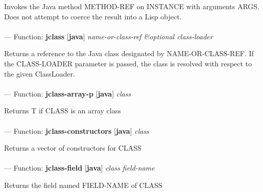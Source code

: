 \begin{adjustwidth}{5em}{5em}
Invokes the Java method METHOD-REF on INSTANCE with arguments ARGS. Does not attempt to coerce the result into a Lisp object.
\end{adjustwidth}

\paragraph{}
\label{JAVA:JCLASS}
--- Function: \textbf{jclass} [\textbf{java}] \textit{name-or-class-ref \&optional class-loader}

\begin{adjustwidth}{5em}{5em}
Returns a reference to the Java class designated by NAME-OR-CLASS-REF. If the CLASS-LOADER parameter is passed, the class is resolved with respect to the given ClassLoader.
\end{adjustwidth}

\paragraph{}
\label{JAVA:JCLASS-ARRAY-P}
--- Function: \textbf{jclass-array-p} [\textbf{java}] \textit{class}

\begin{adjustwidth}{5em}{5em}
Returns T if CLASS is an array class
\end{adjustwidth}

\paragraph{}
\label{JAVA:JCLASS-CONSTRUCTORS}
--- Function: \textbf{jclass-constructors} [\textbf{java}] \textit{class}

\begin{adjustwidth}{5em}{5em}
Returns a vector of constructors for CLASS
\end{adjustwidth}

\paragraph{}
\label{JAVA:JCLASS-FIELD}
--- Function: \textbf{jclass-field} [\textbf{java}] \textit{class field-name}

\begin{adjustwidth}{5em}{5em}
Returns the field named FIELD-NAME of CLASS
\end{adjustwidth}

